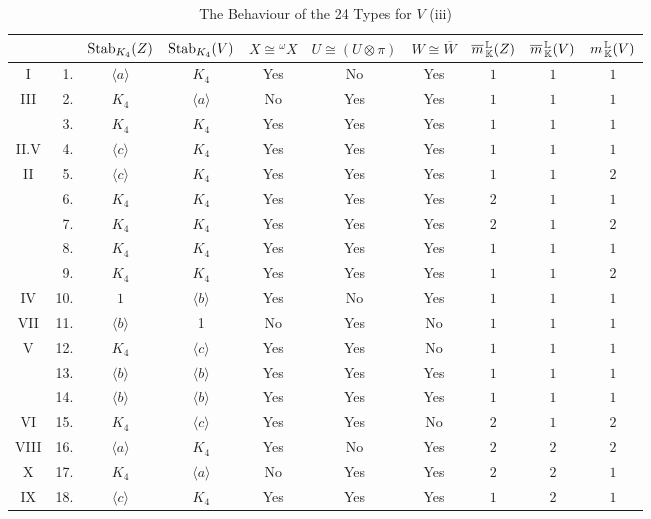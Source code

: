 \begin{table}[p] %
    \vspace{4cm}
\centering
\bgroup
\caption{The Behaviour of the 24 Types for $V$ (iii)}
\label{tab:24types5}
\def\arraystretch{1.1}
\begin{tabular}{c r c c c c c c c c}
    \toprule
    & & $\operatorname{Stab}_{K_4}(Z)$ & $\operatorname{Stab}_{K_4}(V)$ & $X \cong {}^{\omega}X$ & $U \cong (U \otimes \pi)$ & $W \cong \overline{W}$ & $\overline{m}_{\, {\mathbb K}}^{\, {\mathbb L}}(Z)$ & $\overline{m}_{\, {\mathbb K}}^{\, {\mathbb L}}(V)$ & $m_{\, {\mathbb K}}^{\, {\mathbb L}}(V)$ \\
    \midrule
I & 1.  & $\langle a \rangle$ & $K_4$ & Yes & No & Yes & $1$ & $1$ & $1$ \\ 
III & 2.  & $K_4$ & $\langle a \rangle$ & No & Yes & Yes & $1$ & $1$ & $1$ \\ 
& 3.  & $K_4$ & $K_4$ & Yes & Yes & Yes & $1$ & $1$ & $1$ \\ 
II.V & 4.  & $\langle c \rangle$ & $K_4$ & Yes & Yes & Yes & $1$ & $1$ & $1$ \\ 
II & 5.  & $\langle c \rangle$ & $K_4$ & Yes & Yes & Yes & $1$ & $1$ & $2$ \\ 
& 6.  & $K_4$ & $K_4$ & Yes & Yes & Yes & $2$ & $1$ & $1$ \\ 
& 7.  & $K_4$ & $K_4$ & Yes & Yes & Yes & $2$ & $1$ & $2$ \\ 
& 8.  & $K_4$ & $K_4$ & Yes & Yes & Yes & $1$ & $1$ & $1$ \\ 
& 9.  & $K_4$ & $K_4$ & Yes & Yes & Yes & $1$ & $1$ & $2$ \\ 
IV & 10. & $1$ & $\langle b \rangle$ & Yes & No & Yes & $1$ & $1$ & $1$ \\ 
VII & 11. & $\langle b \rangle$ & 1 & No & Yes & No & $1$ & $1$ & $1$ \\ 
V & 12. & $K_4$ & $\langle c \rangle$ & Yes & Yes & No & $1$ & $1$ & $1$ \\ 
& 13. & $\langle b \rangle$ & $\langle b \rangle$ & Yes & Yes & Yes & $1$ & $1$ & $1$ \\ 
& 14. & $\langle b \rangle$ & $\langle b \rangle$ & Yes & Yes & Yes & $1$ & $1$ & $1$ \\ 
VI & 15. & $K_4$ & $\langle c \rangle$ & Yes & Yes & No & $2$ & $1$ & $2$ \\ 
VIII & 16. & $\langle a \rangle$ & $K_4$ & Yes & No & Yes & $2$ & $2$ & $2$ \\ 
X & 17. & $K_4$ & $\langle a \rangle$ & No & Yes & Yes & $2$ & $2$ & $1$ \\ 
IX & 18. & $\langle c \rangle$ & $K_4$ & Yes & Yes & Yes & $1$ & $2$ & $1$ \\ 

\end{tabular}
\end{table}
